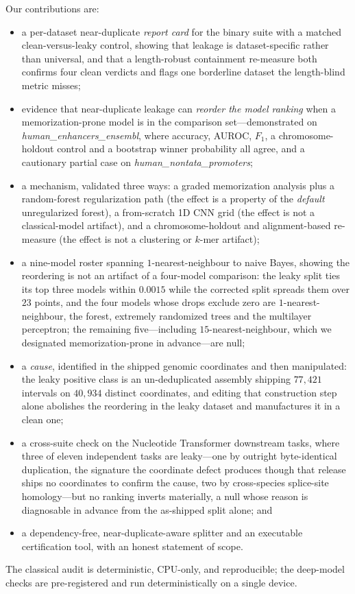 \documentclass[webpdf,modern,large,namedate]{oup-authoring-template}%
\begin{document}
Our contributions are:
\begin{itemize}
\item a per-dataset near-duplicate \emph{report card} for the binary suite with a matched clean-versus-leaky control, showing that leakage is dataset-specific rather than universal, and that a length-robust containment re-measure both confirms four clean verdicts and flags one borderline dataset the length-blind metric misses;
\item evidence that near-duplicate leakage can \emph{reorder the model ranking} when a memorization-prone model is in the comparison set---demonstrated on \textit{human\_enhancers\_ensembl}, where accuracy, AUROC, $F_1$, a chromosome-holdout control and a bootstrap winner probability all agree, and a cautionary partial case on \textit{human\_nontata\_promoters};
\item a mechanism, validated three ways: a graded memorization analysis plus a random-forest regularization path (the effect is a property of the \emph{default} unregularized forest), a from-scratch 1D CNN grid (the effect is not a classical-model artifact), and a chromosome-holdout and alignment-based re-measure (the effect is not a clustering or $k$-mer artifact);
\item a nine-model roster spanning $1$-nearest-neighbour to naive Bayes, showing the reordering is not an artifact of a four-model comparison: the leaky split ties its top three models within $0.0015$ while the corrected split spreads them over $23$ points, and the four models whose drops exclude zero are $1$-nearest-neighbour, the forest, extremely randomized trees and the multilayer perceptron; the remaining five---including $15$-nearest-neighbour, which we designated memorization-prone in advance---are null;
\item a \emph{cause}, identified in the shipped genomic coordinates and then manipulated: the leaky positive class is an un-deduplicated assembly shipping $77{,}421$ intervals on $40{,}934$ distinct coordinates, and editing that construction step alone abolishes the reordering in the leaky dataset and manufactures it in a clean one;
\item a cross-suite check on the Nucleotide Transformer downstream tasks, where three of eleven independent tasks are leaky---one by outright byte-identical duplication, the signature the coordinate defect produces though that release ships no coordinates to confirm the cause, two by cross-species splice-site homology---but no ranking inverts materially, a null whose reason is diagnosable in advance from the as-shipped split alone; and
\item a dependency-free, near-duplicate-aware splitter and an executable certification tool, with an honest statement of scope.
\end{itemize}
The classical audit is deterministic, CPU-only, and reproducible; the deep-model checks are pre-registered and run deterministically on a single device.
\end{document}
